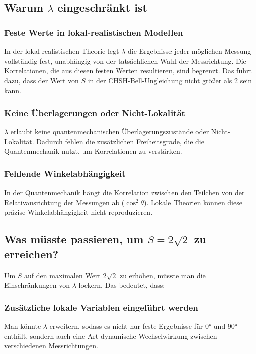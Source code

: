 \documentclass[12pt,a4paper]{article}
\begin{document}
	
	\subsection{Warum $\lambda$ eingeschränkt ist}
	
	\subsubsection{Feste Werte in lokal-realistischen Modellen}
	In der lokal-realistischen Theorie legt $\lambda$ die Ergebnisse jeder möglichen Messung vollständig fest, unabhängig von der tatsächlichen Wahl der Messrichtung. Die Korrelationen, die aus diesen festen Werten resultieren, sind begrenzt. Das führt dazu, dass der Wert von $S$ in der CHSH-Bell-Ungleichung nicht größer als 2 sein kann.
	
	\subsubsection{Keine Überlagerungen oder Nicht-Lokalität}
	$\lambda$ erlaubt keine quantenmechanischen Überlagerungszustände oder Nicht-Lokalität. Dadurch fehlen die zusätzlichen Freiheitsgrade, die die Quantenmechanik nutzt, um Korrelationen zu verstärken.
	
	\subsubsection{Fehlende Winkelabhängigkeit}
	In der Quantenmechanik hängt die Korrelation zwischen den Teilchen von der Relativausrichtung der Messungen ab ($\cos^2 \theta$). Lokale Theorien können diese präzise Winkelabhängigkeit nicht reproduzieren.
	
	\subsection{Was müsste passieren, um $S = 2 \sqrt{2}$ zu erreichen?}
	Um $S$ auf den maximalen Wert $2 \sqrt{2}$ zu erhöhen, müsste man die Einschränkungen von $\lambda$ lockern. Das bedeutet, dass:
	
	\subsubsection{Zusätzliche lokale Variablen eingeführt werden}
	Man könnte $\lambda$ erweitern, sodass es nicht nur feste Ergebnisse für 0° und 90° enthält, sondern auch eine Art dynamische Wechselwirkung zwischen verschiedenen Messrichtungen.
	
\end{document}
